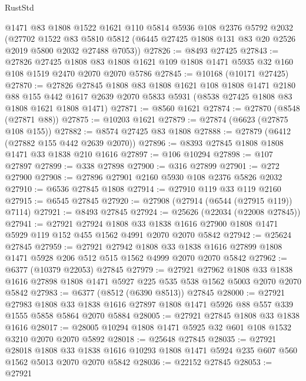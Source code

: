 \begin{lexlean}{RustStd}
\begin{coremodule}
    @1471
    @83
    @1808
    @1522
    @1621
    @110
    @5814
    @5936
    @108
    @2376
    @5792
    @2032
    (@27702
      @1522
      @83
      @5810
      @5812
      (@6445 @27425 @1808 @131 @83 @20 @2526 @2019 @5800 @2032 @27488 @7053))
@27826 := @8493 @27425
@27843 := @27826
    @27425
    @1808
    @83
    @1808
    @1621
    @109
    @1808
    @1471
    @5935
    @32
    @160
    @108
    @1519
    @2470
    @2070
    @2070
    @5786
@27845 := @10168 (@10171 @27425)
@27870 := @27826
    @27845
    @1808
    @83
    @1808
    @1621
    @108
    @1808
    @1471
    @2180
    @88
    @155
    @442
    @1617
    @2639
    @2070
    @5833
    @5931
    (@8538 @27425 @1808 @83 @1808 @1621 @1808 @1471)
@27871 := @8560 @1621
@27874 := @27870 (@8548 (@27871 @88))
@27875 := @10203 @1621
@27879 := @27874 (@6623 (@27875 @108 @155))
@27882 := @8574 @27425 @83 @1808
@27888 := @27879 (@6412 (@27882 @155 @442 @2639 @2070))
@27896 := @8393 @27845 @1808 @1808 @1471 @33 @1838 @210 @1616
@27897 := @106 @10294
@27898 := @107 @27897
@27899 := @338 @27898
@27900 := @316 @27899
@27901 := @272 @27900
@27908 := @27896 @27901 @2160 @5930 @108 @2376 @5826 @2032
@27910 := @6536 @27845 @1808
@27914 := @27910 @119 @33 @119 @2160
@27915 := @6545 @27845
@27920 := @27908 (@27914 (@6544 (@27915 @119)) @7114)
@27921 := @8493 @27845
@27924 := @25626 (@22034 (@22008 @27845))
@27941 := @27921
    @27924
    @1808
    @33
    @1838
    @1616
    @27900
    @1808
    @1471
    @5929
    @119
    @152
    @455
    @1562
    @4991
    @2070
    @2070
    @5842
@27942 := @25624 @27845
@27959 := @27921
    @27942
    @1808
    @33
    @1838
    @1616
    @27899
    @1808
    @1471
    @5928
    @206
    @512
    @515
    @1562
    @4999
    @2070
    @2070
    @5842
@27962 := @6377 (@10379 @22053) @27845
@27979 := @27921
    @27962
    @1808
    @33
    @1838
    @1616
    @27898
    @1808
    @1471
    @5927
    @225
    @535
    @538
    @1562
    @5003
    @2070
    @2070
    @5842
@27983 := @6377 (@8512 (@6390 @8513)) @27845
@28000 := @27921
    @27983
    @1808
    @33
    @1838
    @1616
    @27897
    @1808
    @1471
    @5926
    @88
    @557
    @339
    @1555
    @5858
    @5864
    @2070
    @5884
@28005 := @27921 @27845 @1808 @33 @1838 @1616
@28017 := @28005 @10294 @1808 @1471 @5925 @32 @601 @108 @1532 @3210 @2070 @2070 @5892
@28018 := @25648 @27845
@28035 := @27921
    @28018
    @1808
    @33
    @1838
    @1616
    @10293
    @1808
    @1471
    @5924
    @235
    @607
    @560
    @1562
    @5013
    @2070
    @2070
    @5842
@28036 := @22152 @27845
@28053 := @27921

\end{coremodule}
\end{lexlean}
